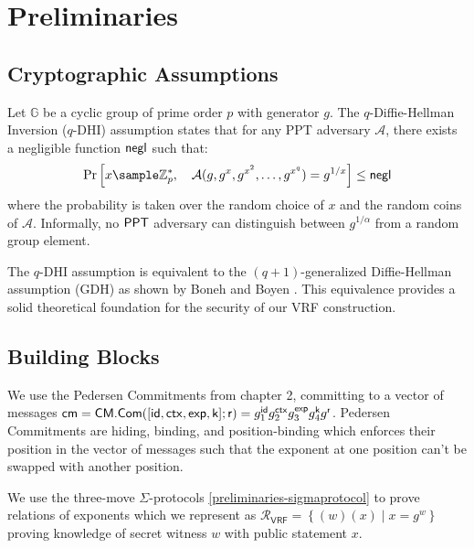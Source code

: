 \section{Preliminaries}
\subsection{Cryptographic Assumptions}

\begin{definition}
Let $\mathbb{G}$ be a cyclic group of prime order $p$ with generator $g$. The $q$-Diffie-Hellman Inversion ($q$-DHI) assumption \cite{mitsunari_new_2002} states that for any PPT adversary $\mathcal{A}$, there exists a negligible function $\mathsf{negl}$ such that:
\[
\Pr\left[ x \sample \Zp^*, \quad \mathcal{A}(g, g^x, g^{x^2}, \ldots, g^{x^q}) = g^{1/x} \right] \leq \negl 
\]
where the probability is taken over the random choice of $x$ and the random coins of $\mathcal{A}$. Informally, no $\mathsf{PPT}$ adversary can distinguish between $g^{1/\alpha}$ from a random group element.
\end{definition}

\begin{remark}
The $q$-DHI assumption is equivalent to the $(q+1)$-generalized Diffie-Hellman assumption (GDH) as shown by Boneh and Boyen \cite{kanade_efficient_2004}. This equivalence provides a solid theoretical foundation for the security of our VRF construction.
\end{remark}


\subsection{Building Blocks}
We use the Pedersen Commitments from chapter 2, committing to a vector of messages $\mathsf{cm} = \mathsf{CM.Com}([\mathsf{id}, \mathsf{ctx}, \mathsf{exp}, \mathsf{k}];\mathsf{r}) = g_1^{\mathsf{id}} g_2^{\mathsf{ctx}} g_3^{\mathsf{exp}} g_4^{\mathsf{k}} g^{\mathsf{r}}$. Pedersen Commitments are hiding, binding, and position-binding which enforces their position in the vector of messages such that the exponent at one position can't be swapped with another position. 

We use the three-move $\Sigma$-protocols \ref{preliminaries-sigmaprotocol} to prove relations of exponents which we represent as $\mathcal{R}_{\mathsf{VRF}} = \left\{(w)(x) \mid x = g^w \right\}$ proving knowledge of secret witness $w$ with public statement $x$. 


